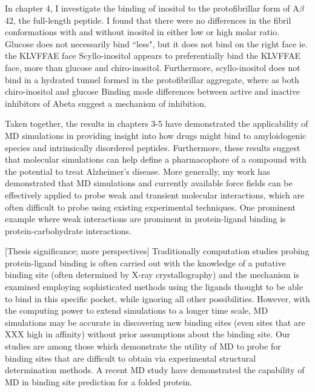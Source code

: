 In chapter 4, I investigate the binding of inositol to the protofibrillar form of A$\beta$42, the full-length peptide. I found that there were no differences in the fibril conformations with and without inositol in either low or high molar ratio.
Glucose does not necessarily bind ``less", but it does not bind on the right face ie. the KLVFFAE face Scyllo-inositol appears to preferentially bind the KLVFFAE face, more than glucose and chiro-inositol.  Furthermore, scyllo-inositol does not bind in a hydrated tunnel formed in the protofibrillar aggregate, where as both chiro-inositol and glucose Binding mode differences between active and inactive inhibitors of Abeta suggest a mechanism of inhibition.

Taken together, the results in chapters 3-5 have demonstrated the applicability of MD simulations in providing insight into how drugs might bind to amyloidogenic species and intrinsically disordered peptides.  Furthermore, these results suggest that molecular simulations can help define a pharmacophore of a compound with the potential to treat Alzheimer's disease. 
More generally, my work has demonstrated that MD simulations and currently available force fields can be effectively applied to probe weak and transient molecular interactions, which are often difficult to probe using existing experimental techniques. One prominent example where weak interactions are prominent in protein-ligand binding is protein-carbohydrate interactions.\cite{weak binding review paper}

[Thesis significance; more perspectives] Traditionally computation studies probing protein-ligand binding is often carried out with the knowledge of a putative binding site (often determined by X-ray crystallography) and the mechanism is examined employing sophisticated methods using the ligands thought to be able to bind in this specific pocket, while ignoring all other possibilities.  However, with the computing power to extend simulations to a longer time scale, MD simulations may be accurate in discovering new binding sites (even sites that are XXX high in affinity) without prior assumptions about the binding site. Our studies are among those which demonstrate the utility of MD to probe for binding sites that are difficult to obtain via experimental structural determination methods.  A recent MD study have demonstrated the capability of MD in binding site prediction for a folded protein.\cite{Shan:2011bo}

